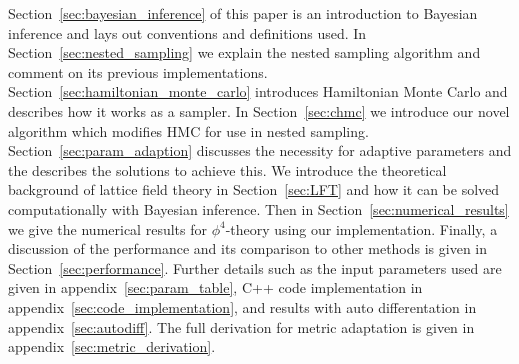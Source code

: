 \documentclass[11pt]{article}
\begin{document}
    Section~\ref{sec:bayesian_inference} of this paper is an introduction to Bayesian inference and lays out conventions
    and definitions used.
    In Section~\ref{sec:nested_sampling} we explain the nested sampling algorithm and comment on its
    previous implementations.
    Section~\ref{sec:hamiltonian_monte_carlo} introduces Hamiltonian Monte Carlo and describes how it works as a sampler.
    In Section~\ref{sec:chmc} we introduce our novel algorithm which modifies HMC for use in nested sampling.
    Section~\ref{sec:param_adaption} discusses the necessity for adaptive parameters and the describes the solutions
    to achieve this.
    We introduce the theoretical background of lattice field theory in Section~\ref{sec:LFT} and how it can be
    solved computationally with Bayesian inference.
    Then in Section~\ref{sec:numerical_results} we give the numerical results for $\phi^4$-theory
    using our implementation.
    Finally, a discussion of the performance and its comparison to other methods is given in Section~\ref{sec:performance}.
    Further details such as the input parameters used are given in appendix~\ref{sec:param_table},
    C++ code implementation in appendix~\ref{sec:code_implementation}, and results with auto differentation in
    appendix~\ref{sec:autodiff}.
    The full derivation for metric adaptation is given in appendix~\ref{sec:metric_derivation}.
\end{document}

